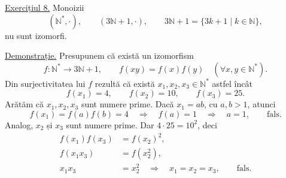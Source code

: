 \smallskip
{}

\medskip
\noindent\underline{Exercițiul 8.}
Monoizii
\[
 (\mathbb N^*,\cdot),\qquad
 (3\mathbb N+1,\cdot),\qquad
 3\mathbb N+1=\{3k+1\mid k\in\mathbb N\},
\]
nu sunt izomorfi.

\noindent\underline{Demonstrație.}
Presupunem că există un izomorfism
\[
 f:\mathbb N^*\longrightarrow 3\mathbb N+1,
 \qquad f(xy)=f(x)f(y)
 \quad(\forall x,y\in\mathbb N^*).
\]
Din surjectivitatea lui $f$ rezultă că există $x_1,x_2,x_3\in\mathbb N^*$
astfel încât
\[
 f(x_1)=4,\qquad f(x_2)=10,\qquad f(x_3)=25.
\]
Arătăm că $x_1,x_2,x_3$ sunt numere prime.
Dacă $x_1=ab$, cu $a,b>1$, atunci
\[
 f(x_1)=f(a)f(b)=4
 \quad\Longrightarrow\quad f(a)=1
 \quad\Longrightarrow\quad a=1,
 \qquad\text{fals.}
\]
Analog, $x_2$ și $x_3$ sunt numere prime.
Dar $4\cdot25=10^2$, deci
\[
\begin{aligned}
 f(x_1)f(x_3)&=f(x_2)^2,\\
 f(x_1x_3)&=f(x_2^2),\\
 x_1x_3&=x_2^2
  \quad\Longrightarrow\quad x_1=x_2=x_3,
  \qquad\text{fals.}
\end{aligned}
\]
